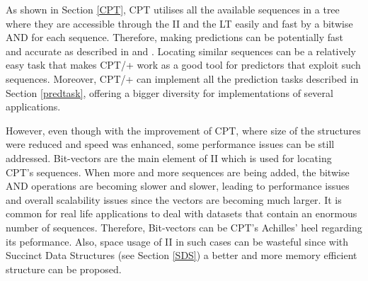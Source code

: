 As shown in Section \ref{CPT}, CPT utilises all the available sequences in a tree where they are accessible through the II and the LT easily and fast by a bitwise AND for each sequence. Therefore, making predictions can be potentially fast and accurate as described in \citep{gueniche_fournier-viger_tseng_2013} and \citep{gueniche_fournier-viger_raman_tseng_2015}. Locating similar sequences can be a relatively easy task that makes CPT/+ work as a good tool for predictors that exploit such sequences. Moreover, CPT/+ can implement all the prediction tasks described in Section \ref{predtask}, offering a bigger diversity for implementations of several applications. 
\par However, even though with the improvement of CPT, where size of the structures were reduced and speed was  enhanced, some performance issues can be still addressed. Bit-vectors are the main element of II which is used for locating CPT's sequences. When more and more sequences are being added, the bitwise AND operations are becoming slower and slower, leading to performance issues and overall scalability issues since the vectors are becoming much larger. It is common for real life applications to deal with datasets that contain an enormous number of sequences. Therefore, Bit-vectors can be CPT's Achilles' heel regarding its peformance. Also, space usage of II in such cases can be wasteful since with Succinct Data Structures (see Section \ref{SDS}) a better and more memory efficient structure can be proposed.

